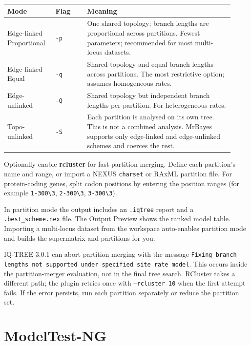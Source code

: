 \documentclass[10pt]{report}
\begin{document}
\begin{longtable}{@{}>{\raggedright\arraybackslash}p{0.19\linewidth}
                      >{\raggedright\arraybackslash}p{0.13\linewidth}
                      >{\raggedright\arraybackslash}p{0.60\linewidth}@{}}
\toprule
Mode & Flag & Meaning \\
\midrule
\endhead
Edge-linked Proportional & \texttt{-p} & One shared topology; branch lengths
are proportional across partitions. Fewest parameters; recommended for most
multi-locus datasets. \\
Edge-linked Equal & \texttt{-q} & Shared topology and equal branch lengths
across partitions. The most restrictive option; assumes homogeneous rates. \\
Edge-unlinked & \texttt{-Q} & Shared topology but independent branch lengths
per partition. For heterogeneous rates. \\
Topo-unlinked & \texttt{-S} & Each partition is analysed on its own tree. This
is not a combined analysis. MrBayes supports only edge-linked and
edge-unlinked schemes and coerces the rest. \\
\bottomrule
\end{longtable}

Optionally enable \textbf{rcluster} for fast partition merging. Define each
partition's name and range, or import a NEXUS \texttt{charset} or RAxML
partition file. For protein-coding genes, split codon positions by entering
the position ranges (for example \texttt{1-300\textbackslash{}3},
\texttt{2-300\textbackslash{}3}, \texttt{3-300\textbackslash{}3}).

In partition mode the output includes an \texttt{.iqtree} report and a
\texttt{.best\_scheme.nex} file. The Output Preview shows the ranked model
table. Importing a multi-locus dataset from the workspace auto-enables
partition mode and builds the supermatrix and partitions for you.

\begin{warning}
IQ-TREE 3.0.1 can abort partition merging with the message
\texttt{Fixing branch lengths not supported under specified site rate model}.
This occurs inside the partition-merger evaluation, not in the final tree
search. RCluster takes a different path; the plugin retries once with
\texttt{--rcluster 10} when the first attempt fails. If the error persists,
run each partition separately or reduce the partition set.
\end{warning}

\section{ModelTest-NG}
\end{document}
